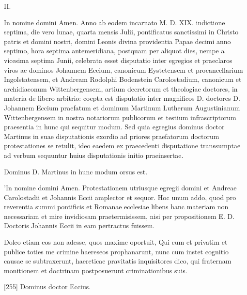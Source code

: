 II.

In nomine domini Amen. Anno ab eodem incarnato M. D. XIX. indictione septima, die vero lunae, quarta mensis Julii, pontificatus sanctissimi in Christo patris et domini nostri, domini Leonis divina providentia Papae decimi anno septimo, hora septima antemeridiana, postquam per aliquot dies, nempe a vicesima septima Junii, celebrata esset disputatio inter egregios et praeclaros viros ac dominos Johannem Eccium, canonicum Eystetensem et procancellarium Ingolstatensem, et Andream Rodolphi Bodenstein Carolostadium, canonicum et archidiaconum Wittenbergensem, artium decretorum et theologiae doctores, in materia de libero arbitrio: coepta est disputatio inter magnificos D. doctores D. Johannem Eccium praefatum et dominum Martinum Lutherum Augustinianum Wittenbergensem in nostra notariorum publicorum et testium infrascriptorum praesentia in hunc qui sequitur modum. Sed quia egregius dominus doctor Martinus in suae disputationis exordio ad priores praefatorum doctorum protestationes se retulit, ideo eaedem ex praecedenti disputatione transsumptae ad verbum sequuntur huius disputationis initio praeinsertae.

Dominus D. Martinus in hunc modum orsus est.

'In nomine domini Amen. Protestationem utriusque egregii domini et Andreae Carolostadii et Johannis Eccii amplector et sequor. Hoc unum addo, quod pro reverentia summi pontificis et Romanae ecclesiae libens hanc materiam non necessariam et mire invidiosam praetermisissem, nisi per propositionem E. D. Doctoris Johannis Eccii in eam pertractus fuissem.

Doleo etiam eos non adesse, quos maxime oportuit, Qui cum et privatim et publice toties me crimine haereseos prophanarunt, nunc cum instet cognitio causae se subtraxerunt, haereticae pravitatis inquisitores dico, qui fraternam monitionem et doctrinam postposuerunt criminationibus suis.

[255] Dominus doctor Eccius.

